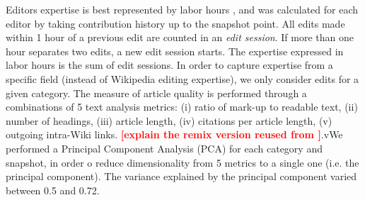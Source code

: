 Editors expertise is best represented by labor hours \cite{geiger2013}, and was calculated for each editor by taking contribution history up to the snapshot point. All edits made within 1 hour of a previous edit are counted in an {\it edit session}. If more than one hour separates two edits, a new edit session starts. The expertise expressed in labor hours is the sum of edit sessions. In order to capture expertise from a specific field (instead of Wikipedia editing expertise), we only consider edits for a given category. The measure of article quality is performed through a combinations of 5 text analysis metrics: (i) ratio of mark-up to readable text, (ii) number of headings, (iii) article length, (iv) citations per article length, (v) outgoing intra-Wiki links. \textcolor{red}{\bf [explain the remix version reused from \cite{klein}]}.vWe performed a Principal Component Analysis (PCA) for each category and snapshot, in order o reduce dimensionality from 5 metrics to a single one (i.e. the principal component). The variance explained by the principal component varied between 0.5 and 0.72.


